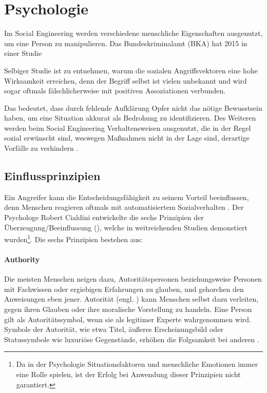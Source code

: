 \chapter{Psychologie}
\label{chapter:psychologie}

Im Social Engineering werden verschiedene menschliche Eigenschaften ausgenutzt, um eine Person zu manipulieren.
Das Bundeskriminalamt (BKA) hat 2015 in einer Studie 

Selbiger Studie ist zu entnehmen, warum die sozialen Angriffsvektoren eine hohe Wirksamkeit erreichen, denn der Begriff selbst
ist vielen unbekannt und wird sogar oftmals fälschlicherweise mit positiven Assoziationen verbunden.

Das bedeutet, dass durch fehlende Aufklärung Opfer nicht das nötige Bewusstsein haben, um eine Situation akkurat als Bedrohung zu identifizieren.
Des Weiteren werden beim Social Engineering Verhaltensweisen ausgenutzt, die in der Regel sozial erwünscht sind, weswegen Maßnahmen nicht in der Lage sind, derartige Vorfälle zu verhindern .

\section{Einflussprinzipien}

Ein Angreifer kann die Entscheidungsfähigkeit zu seinem Vorteil beeinflussen, denn Menschen reagieren oftmals mit automatisiertem Sozialverhalten .
Der Psychologe Robert Cialdini entwickelte die sechs Prinzipien der Überzeugung/Beeinflussung (),
welche in weitreichenden Studien demonstiert wurden\footnote{Da in der Psychologie Situationsfaktoren und menschliche Emotionen immer eine Rolle spielen, ist der Erfolg bei Anwendung dieser Prinzipien nicht garantiert.}.
Die sechs Prinzipien bestehen aus:

\subsubsection{Authority}
Die meisten Menschen neigen dazu, Autoritätspersonen beziehungsweise Personen mit Fachwissen oder ergiebigen Erfahrungen zu glauben, und gehorchen den Anweisungen eben jener.
Autorität (engl. ) kann Menschen selbst dazu verleiten, gegen ihren Glauben oder ihre moralische Vorstellung zu handeln.
Eine Person gilt als Autoritätssymbol, wenn sie als legitimer Experte wahrgenommen wird. Symbole der Autorität, wie etwa Titel, äußeres Erscheinungsbild oder Statussymbole wie
luxuriöse Gegenstände, erhöhen die Folgsamkeit bei anderen .

